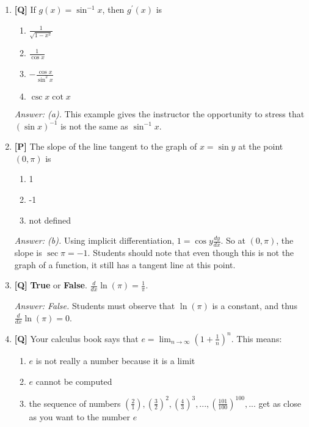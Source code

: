 \documentclass[12pt]{article}
\begin{document}
\begin{enumerate}
{\it Answer: (c).} All equations in $x$ and $y$ can be written as a sum of terms of the form $f(x)g(y)$, and hence using implicit differentiation on this term, 
$$\frac{d}{dx}f(x)g(y)=f^{\prime}(x)g(y)+f(x)\frac{d}{dy}g(y)\cdot y^{\prime}$$ 
hence no term in the sum has factors of the form $(y^{\prime})^2$. Therefore, we never have to solve a quadratic. 
Students might be most comfortable answering $(b)$, and if so, ask them first if they ever had to solve a quadratic while using implicit differentiation, and then go into more detail to why this does not happen.

\bigskip

\item {\bf [Q]} If $g(x)=\sin^{-1} x$, then $g^{\prime}(x)$ is
\begin {enumerate}
\item $\frac{1}{\sqrt{1-x^2}}$
\item $\frac {1}{\cos x}$
\item $-\frac {\cos x}{\sin ^2 x}$
\item $\csc x \cot x$
\end{enumerate}

{\it Answer: (a).} This example gives the instructor the opportunity to stress that $(\sin x)^{-1}$ is not the same as $\sin ^{-1} x$.

\bigskip

\item {\bf [P]} The slope of the line tangent to the graph of $x=\sin y$ at the point $(0,\pi)$ is
\begin {enumerate}
\item 1
\item -1
\item not defined
\end{enumerate}

{\it Answer: (b).} Using implicit differentiation, $\displaystyle{1=\cos y \frac{dy}{dx}}$. So at 
$(0, \pi)$, the slope is $\sec \pi=-1$. Students should note that even though this is not the graph 
of a function, it still has a tangent line at this point.

\bigskip

\item {\bf [Q]} \textbf{True} or \textbf{False}. $\frac{d}{dx}\ln (\pi)=\frac{1}{\pi}$.

{\it Answer: False.} Students must observe that $\ln (\pi)$ is a constant, and thus $\frac{d}{dx}\ln (\pi)=0$.

\bigskip

\item {\bf [Q]} Your calculus book says that $\displaystyle{e=\lim_{n\to\infty}\left(1+{\frac{1}{n}}\right)^n}$.  This means:
\begin{enumerate}
\item $e$ is not really a number because it is a limit
\item $e$ cannot be computed
\item the sequence of numbers $\displaystyle{\left(\frac{2}{1}\right), \left(\frac{3}{2}\right)^2, \left(\frac{4}{3}\right)^3, ..., \left(\frac{101}{100}\right)^{100}, ...}$ get as close as you want to the number $e$
\end{enumerate}


\end{enumerate}
\end{document}
